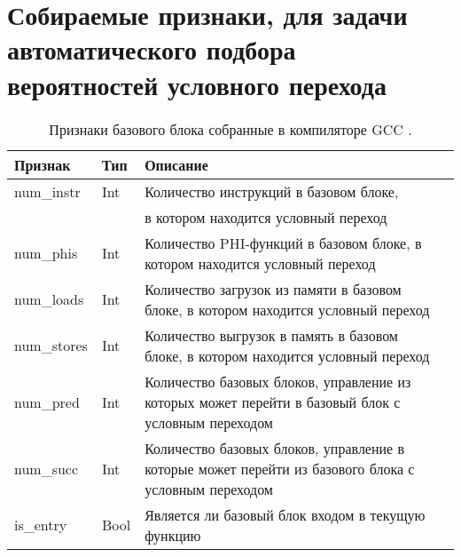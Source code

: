 \chapter{Собираемые признаки, для задачи автоматического подбора вероятностей условного перехода} \label{app:A}
\begin{table} [htbp]
	\centering
	\begin{threeparttable}%
		\caption{Признаки базового блока собранные в компиляторе GCC .}\label{op:pgo_geatures1}%
		\begin{tabular}{| m{3cm} | m{1cm} |  m{9cm}l |}
			\hline
			\hline
			\centering \textbf{Признак}			 & \centering  \textbf{Тип} &  \centering  \textbf{Описание} & \\
			\hline
			\centering num\_instr			 & \centering  Int & Количество инструкций в базовом блоке, & \\
			&                 & в котором находится условный переход & \\
			\hline
			\centering num\_phis			 & \centering  Int &    Количество PHI-функций в базовом блоке, в котором находится условный переход & \\
			\hline
			\centering num\_loads			 & \centering  Int &    Количество загрузок из памяти в базовом блоке, в котором находится условный переход & \\
			\hline
			\centering num\_stores			 & \centering  Int &    Количество выгрузок в память в базовом блоке, в котором находится условный переход & \\
			\hline
			\centering num\_pred			 & \centering  Int &    Количество базовых блоков, управление из которых может перейти в базовый блок с условным переходом & \\
			\hline
			\centering num\_succ			 & \centering  Int &    Количество базовых блоков, управление в которые может перейти из базового блока с условным переходом & \\
			\hline
			\centering is\_entry			 & \centering  Bool &   Является ли базовый блок входом в текущую  функцию & \\
			\hline
			\hline
		\end{tabular}
	\end{threeparttable}
\end{table}

